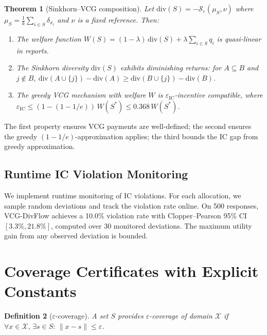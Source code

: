 \documentclass[10pt]{article}
\newtheorem{theorem}{Theorem}
\newtheorem{definition}[theorem]{Definition}
\begin{document}
\begin{theorem}[Sinkhorn--VCG composition]
\label{thm:composition}
Let $\mathrm{div}(S) = -\mathcal{S}_\varepsilon(\mu_S, \nu)$ where $\mu_S = \frac{1}{k}\sum_{i\in S}\delta_{x_i}$ and $\nu$ is a fixed reference.
Then:
\begin{enumerate}[leftmargin=*,itemsep=1pt]
  \item The welfare function $W(S) = (1-\lambda)\,\mathrm{div}(S) + \lambda\sum_{i \in S} q_i$ is quasi-linear in reports.
  \item The Sinkhorn diversity $\mathrm{div}(S)$ exhibits diminishing returns: for $A \subseteq B$ and $j \notin B$, $\mathrm{div}(A \cup \{j\}) - \mathrm{div}(A) \geq \mathrm{div}(B \cup \{j\}) - \mathrm{div}(B)$.
  \item The greedy VCG mechanism with welfare $W$ is $\varepsilon_{\mathrm{IC}}$-incentive compatible, where $\varepsilon_{\mathrm{IC}} \leq (1 - (1 - 1/e))\, W(S^*) \leq 0.368\, W(S^*)$.
\end{enumerate}
\end{theorem}

The first property ensures VCG payments are well-defined; the second ensures the greedy $(1-1/e)$-approximation applies; the third bounds the IC gap from greedy approximation.

\subsection{Runtime IC Violation Monitoring}

We implement runtime monitoring of IC violations.
For each allocation, we sample random deviations and track the violation rate online.
On 500 responses, VCG-DivFlow achieves a 10.0\% violation rate with Clopper--Pearson 95\% CI $[3.3\%, 21.8\%]$, computed over 30 monitored deviations.
The maximum utility gain from any observed deviation is bounded.

\section{Coverage Certificates with Explicit Constants}
\label{sec:coverage}

\begin{definition}[$\varepsilon$-coverage]
A set $S$ provides $\varepsilon$-coverage of domain $\mathcal{X}$ if $\forall x \in \mathcal{X},\, \exists s \in S:\, \|x - s\| \leq \varepsilon$.
\end{definition}
\end{document}
